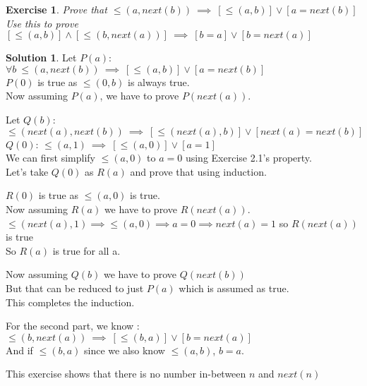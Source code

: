 \documentclass[a4paper,10pt]{article}
\newtheorem{exercise}{Exercise}[section]
\theoremstyle{definition} %
\newtheorem*{solution}{Solution}
\begin{document}
    \begin{exercise}
        Prove that $\leq(a, next(b)) \ \implies \ [\leq(a,b)] \lor [a=next(b)]$ \\
        Use this to prove $[\leq(a,b)] \land [\leq(b,next(a))] \ \implies \ [b=a] \lor [b=next(a)]$
    \end{exercise}
    \begin{solution}
        Let $P(a)$: $\forall b \ \leq(a, next(b)) \ \implies \ [\leq(a,b)] \lor [a=next(b)]$ \\
        $P(0)$ is true as $\leq(0,b)$ is always true. \\
        Now assuming $P(a)$, we have to prove $P(next(a))$.
        \begin{adjustwidth}{1cm}{0cm}
            Let $Q(b)$: $\leq(next(a), next(b)) \ \implies \ [\leq(next(a),b)] \lor [next(a)=next(b)]$ \\
            $Q(0)$: $\leq(a, 1) \ \implies \ [\leq(a,0)] \lor [a=1]$ \\
            We can first simplify $\leq(a,0)$ to $a=0$ using Exercise 2.1's property. \\
            Let's take $Q(0)$ as $R(a)$ and prove that using induction.
            \newpage
            \begin{adjustwidth}{1cm}{0cm}
                $R(0)$ is true as $\leq(a,0)$ is true. \\
                Now assuming $R(a)$ we have to prove $R(next(a))$. \\
                $\leq(next(a),1) \implies \leq(a,0) \implies a=0 \implies next(a)=1$ so $R(next(a))$ is true \\
                So $R(a)$ is true for all a.
            \end{adjustwidth}
            Now assuming $Q(b)$ we have to prove $Q(next(b))$ \\
            But that can be reduced to just $P(a)$ which is assumed as true. \\
            This completes the induction.
        \end{adjustwidth}
        
        For the second part, we know : \\
        $\leq(b, next(a)) \ \implies \ [\leq(b, a)] \lor [b = next(a)]$ \\
        And if $\leq(b, a)$ since we also know $\leq(a, b)$, $b = a$.

        This exercise shows that there is no number in-between $n$ and $next(n)$ 
    \end{solution}
\end{document}
